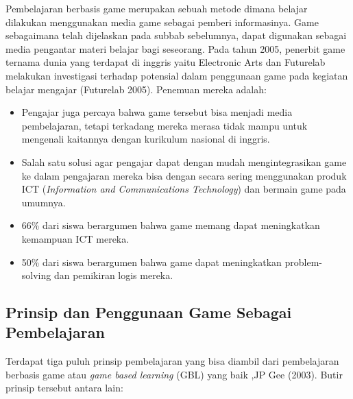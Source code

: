 	Pembelajaran berbasis game merupakan sebuah metode dimana belajar dilakukan menggunakan media game sebagai pemberi informasinya. Game sebagaimana telah dijelaskan pada subbab sebelumnya, dapat digunakan sebagai media pengantar materi belajar bagi seseorang. 
	\linebreak\linebreak
	Pada tahun 2005, penerbit game ternama dunia yang terdapat di inggris yaitu Electronic Arts dan Futurelab melakukan investigasi terhadap potensial dalam penggunaan game pada kegiatan belajar mengajar (Futurelab 2005). Penemuan mereka adalah:
	\begin{itemize}
		\item Pengajar juga percaya bahwa game tersebut bisa menjadi media pembelajaran, tetapi terkadang mereka merasa tidak mampu untuk mengenali kaitannya dengan kurikulum nasional di inggris.
		\item Salah satu solusi agar pengajar dapat dengan mudah mengintegrasikan game ke dalam pengajaran mereka bisa dengan secara sering menggunakan produk ICT (\textit{Information and Communications Technology}) dan bermain game pada umumnya.
		\item 66\% dari siswa berargumen bahwa game memang dapat meningkatkan kemampuan ICT mereka.
		\item 50\% dari siswa berargumen bahwa game dapat meningkatkan problem-solving dan pemikiran logis mereka.
	\end{itemize}
	
	\subsection{Prinsip dan Penggunaan Game Sebagai Pembelajaran}
	
	Terdapat tiga puluh prinsip pembelajaran yang bisa diambil dari pembelajaran berbasis game atau \textit{game based learning} (GBL) yang baik ,JP Gee (2003). Butir prinsip tersebut antara lain:
	
